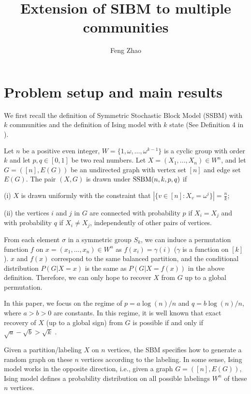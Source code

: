 \documentclass{article}
\title{Extension of SIBM to multiple communities}
\author{Feng Zhao}
\begin{document}
\maketitle

\section{Problem setup and main results} \label{s:Preliminaries}
We first recall the definition of Symmetric Stochastic Block Model (SSBM) with $k$ communities and the definition of Ising model with $k$ state (See Definition 4 in \cite{Abbe17}).
\begin{definition} \label{def:SSBM}
Let $n$ be a positive even integer, $W= \{1, \omega, \dots, \omega^{k-1}\}$ is a cyclic group with order $k$ and let $p,q\in[0,1]$ be two real numbers. Let $X=(X_1,\dots,X_n)\in W^n$, and let $G=([n],E(G))$ be an undirected graph with vertex set $[n]$ and edge set $E(G)$. The pair $(X,G)$ is drawn under $\operatorname{SSBM}(n,k,p,q)$ if 

\noindent
(i) $X$ is drawn uniformly with the constraint that $|\{v \in [n] : X_v = \omega^i\}| = \frac{n}{k}$;

\noindent
(ii) the vertices $i$ and $j$ in $G$ are connected with probability $p$ if $X_i=X_j$ and with probability $q$ if $X_i \neq X_j$, independently of other pairs of vertices.
\end{definition}
 
From each element $\sigma$ in a symmetric group $S_k$, we can induce a permutation function $f$ on $x=(x_1,\dots,x_n)\in W^n$ as $f(x_i) = \gamma(i)$ ($\gamma$ is a function on $[k]$).
$x$ and $f(x)$ correspond to the same balanced partition, and the conditional distribution $P(G|X=x)$ is the same as $P(G|X=f(x))$ in the above definition. Therefore, we can only hope to recover $X$ from $G$ up to a global permutation.

In this paper, we focus on the regime of $p=a\log(n)/n$ and $q=b\log(n)/n$, where $a>b> 0$ are constants. In this regime, it is well known that exact recovery of $X$ (up to a global sign) from $G$ is possible if and only if $\sqrt{a}-\sqrt{b} > \sqrt{k}$  \cite{abbe2015exact}.
 
Given a partition/labeling $X$ on $n$ vertices, the SBM specifies how to generate a random graph on these $n$ vertices according to the labeling. In some sense, Ising model works in the opposite direction, i.e., given a graph $G=([n],E(G))$, Ising model defines a probability distribution on all possible labelings $W^n$ of these $n$ vertices. 
\end{document}
